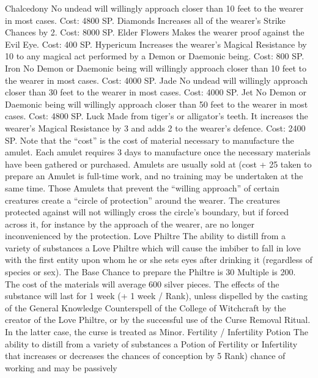 \documentclass[a4paper]{article}
\begin{document}
\begin{multicols}{3}
Chalcedony No undead will willingly approach
closer than 10 feet to the wearer in most cases.
Cost: 4800 SP.
Diamonds Increases all of the wearer’s Strike
Chances by 2. Cost: 8000 SP.
Elder Flowers Makes the wearer proof against the
Evil Eye. Cost: 400 SP.
Hypericum Increases the wearer’s Magical Resistance by 10 to any magical act performed by a
Demon or Daemonic being. Cost: 800 SP.
Iron No Demon or Daemonic being will willingly
approach closer than 10 feet to the wearer in most
cases. Cost: 4000 SP.
Jade No undead will willingly approach closer
than 30 feet to the wearer in most cases. Cost: 4000
SP.
Jet No Demon or Daemonic being will willingly
approach closer than 50 feet to the wearer in most
cases. Cost: 4800 SP.
Luck Made from tiger’s or alligator’s teeth. It
increases the wearer’s Magical Resistance by 3 and
adds 2 to the wearer’s defence. Cost: 2400 SP.
Note that the “cost” is the cost of material necessary to manufacture the amulet. Each amulet requires 3 days to manufacture once the necessary
materials have been gathered or purchased. Amulets are usually sold at (cost + 25%
taken to prepare an Amulet is full-time work, and
no training may be undertaken at the same time.
Those Amulets that prevent the “willing approach”
of certain creatures create a “circle of protection”
around the wearer. The creatures protected against
will not willingly cross the circle’s boundary, but if
forced across it, for instance by the approach of the
wearer, are no longer inconvenienced by the protection.
Love Philtre The ability to distill from a variety of
substances a Love Philtre which will cause the
imbiber to fall in love with the first entity upon
whom he or she sets eyes after drinking it (regardless of species or sex). The Base Chance to prepare
the Philtre is 30%
Multiple is 200. The cost of the materials will
average 600 silver pieces. The effects of the substance will last for 1 week (+ 1 week / Rank),
unless dispelled by the casting of the General
Knowledge Counterspell of the College of Witchcraft by the creator of the Love Philtre, or by the
successful use of the Curse Removal Ritual. In the
latter case, the curse is treated as Minor.
Fertility / Infertility Potion The ability to distill
from a variety of substances a Potion of Fertility or
Infertility that increases or decreases the chances of
conception by 5%
Rank) chance of working and may be passively


\end{multicols}
\end{document}
